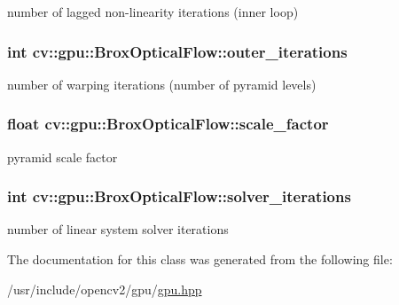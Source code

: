 number of lagged non-\/linearity iterations (inner loop) 

\hypertarget{classcv_1_1gpu_1_1BroxOpticalFlow_a93127c77d03b809ec869f3651162efc0}{
\subsubsection[{outer\-\_\-iterations}]{\setlength{\rightskip}{0pt plus 5cm}int cv\-::gpu\-::\-Brox\-Optical\-Flow\-::outer\-\_\-iterations}}\label{classcv_1_1gpu_1_1BroxOpticalFlow_a93127c77d03b809ec869f3651162efc0}


number of warping iterations (number of pyramid levels) 

\hypertarget{classcv_1_1gpu_1_1BroxOpticalFlow_add237683953a02e7da3757aa555b7a9f}{
\subsubsection[{scale\-\_\-factor}]{\setlength{\rightskip}{0pt plus 5cm}float cv\-::gpu\-::\-Brox\-Optical\-Flow\-::scale\-\_\-factor}}\label{classcv_1_1gpu_1_1BroxOpticalFlow_add237683953a02e7da3757aa555b7a9f}


pyramid scale factor 

\hypertarget{classcv_1_1gpu_1_1BroxOpticalFlow_a2d987464ab9a0919409047db591b64ad}{
\subsubsection[{solver\-\_\-iterations}]{\setlength{\rightskip}{0pt plus 5cm}int cv\-::gpu\-::\-Brox\-Optical\-Flow\-::solver\-\_\-iterations}}\label{classcv_1_1gpu_1_1BroxOpticalFlow_a2d987464ab9a0919409047db591b64ad}


number of linear system solver iterations 



The documentation for this class was generated from the following file\-:\begin{DoxyCompactItemize}
\item 
/usr/include/opencv2/gpu/\hyperlink{gpu_2gpu_8hpp}{gpu.\-hpp}\end{DoxyCompactItemize}
